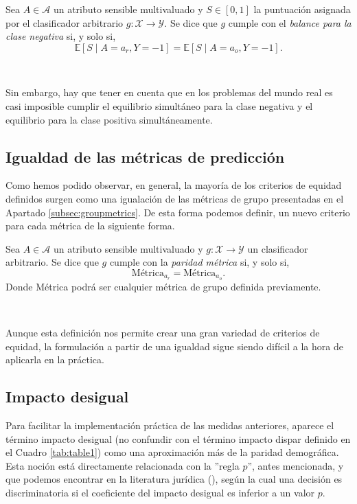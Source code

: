 \documentclass[oneside,openright,titlepage,numbers=noenddot,openany,headinclude,footinclude=true,
cleardoublepage=empty,abstractoff,BCOR=5mm,paper=a4,fontsize=12pt,main=spanish]{scrreprt}
\begin{document}
\begin{definition}
Sea $A \in \mathcal{A}$ un atributo sensible multivaluado y $S\in [0,1]$ la puntuación asignada por el clasificador arbitrario $g\colon \mathcal{X} \to \mathcal{Y}$. Se dice que $g$ cumple con el \textit{balance para la clase negativa} si, y solo si, $$\mathbb{E}[S \mid A=a_r, Y=-1]=\mathbb{E}[S \mid A=a_o, Y=-1].$$
\end{definition}\

Sin embargo, hay que tener en cuenta que
en los problemas del mundo real es casi imposible cumplir el equilibrio simultáneo para la clase negativa y el equilibrio para la clase positiva simultáneamente.

\clearpage

\subsection{Igualdad de las métricas de predicción}

Como hemos podido observar, en general, la mayoría de los criterios de equidad definidos surgen como una igualación de las métricas de grupo presentadas en el Apartado \ref{subsec:groupmetrics}. De esta forma podemos definir, un nuevo criterio para cada métrica de la siguiente forma.\\

\begin{definition}\label{def:parmetr}
Sea $A \in \mathcal{A}$ un atributo sensible multivaluado y $g\colon \mathcal{X} \to \mathcal{Y}$ un clasificador arbitrario. Se dice que $g$ cumple con la \textit{paridad métrica} si, y solo si, $$\text{Métrica}_{a_r}=\text{Métrica}_{a_o}.$$
Donde Métrica podrá ser cualquier métrica de grupo definida previamente. 
\end{definition}\

Aunque esta definición nos permite crear una gran variedad de criterios de equidad, la formulación a partir de una igualdad sigue siendo difícil a la hora de aplicarla en la práctica. 

\subsection{Impacto desigual}

Para facilitar la implementación práctica de las medidas anteriores, aparece el término impacto desigual (no confundir con el término impacto dispar definido en el Cuadro \ref{tab:table1}) como una aproximación más de la paridad demográfica. Esta noción está directamente relacionada con la ''regla $p$'', antes mencionada, y que podemos encontrar en la literatura jurídica (\cite{prule2018}), según la cual una decisión es discriminatoria si el coeficiente del impacto desigual es inferior a un valor $p$.\\
\end{document}
